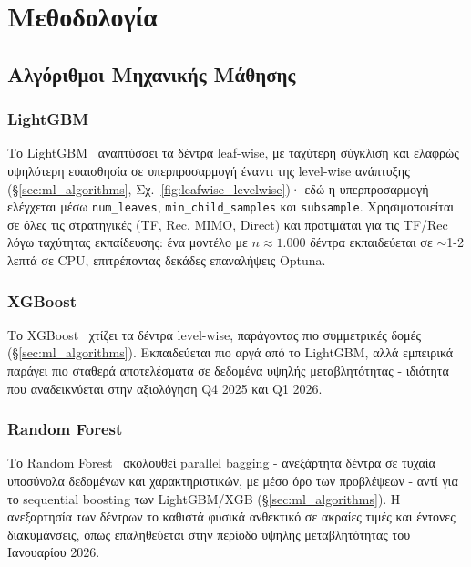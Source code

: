 \chapter{Μεθοδολογία}
\label{ch:methods}

\section{Αλγόριθμοι Μηχανικής Μάθησης}
\label{sec:algorithms}

\subsection{LightGBM}

Το LightGBM~\cite{ke2017lgbm} αναπτύσσει τα δέντρα leaf-wise, με ταχύτερη σύγκλιση και
ελαφρώς υψηλότερη ευαισθησία σε υπερπροσαρμογή έναντι της level-wise ανάπτυξης
(§\ref{sec:ml_algorithms}, Σχ.~\ref{fig:leafwise_levelwise})· εδώ η υπερπροσαρμογή
ελέγχεται μέσω \texttt{num\_leaves}, \texttt{min\_child\_samples} και \texttt{subsample}.
Χρησιμοποιείται σε όλες τις στρατηγικές (TF, Rec, MIMO, Direct) και προτιμάται για τις
TF/Rec λόγω ταχύτητας εκπαίδευσης: ένα μοντέλο με $n \approx 1.000$ δέντρα εκπαιδεύεται σε
$\sim$1-2 λεπτά σε CPU, επιτρέποντας δεκάδες επαναλήψεις Optuna.


\subsection{XGBoost}

Το XGBoost~\cite{chen2016xgboost} χτίζει τα δέντρα level-wise, παράγοντας πιο συμμετρικές
δομές (§\ref{sec:ml_algorithms}). Εκπαιδεύεται πιο αργά από το LightGBM, αλλά εμπειρικά
παράγει πιο σταθερά αποτελέσματα σε δεδομένα υψηλής μεταβλητότητας - ιδιότητα που
αναδεικνύεται στην αξιολόγηση Q4 2025 και Q1 2026.


\subsection{Random Forest}

Το Random Forest~\cite{breiman2001rf} ακολουθεί parallel bagging - ανεξάρτητα δέντρα σε
τυχαία υποσύνολα δεδομένων και χαρακτηριστικών, με μέσο όρο των προβλέψεων - αντί για το
sequential boosting των LightGBM/XGB (§\ref{sec:ml_algorithms}). Η ανεξαρτησία των δέντρων
το καθιστά φυσικά ανθεκτικό σε ακραίες τιμές και έντονες διακυμάνσεις, όπως επαληθεύεται
στην περίοδο υψηλής μεταβλητότητας του Ιανουαρίου 2026.

